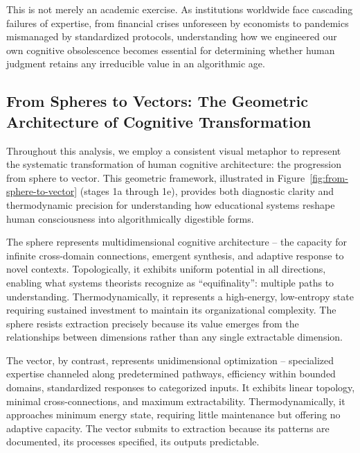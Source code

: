 This is not merely an academic exercise. As institutions worldwide face cascading failures of expertise, from financial crises unforeseen by economists to pandemics mismanaged by standardized protocols, understanding how we engineered our own cognitive obsolescence becomes essential for determining whether human judgment retains any irreducible value in an algorithmic age.

\subsection{From Spheres to Vectors: The Geometric Architecture of Cognitive Transformation}

Throughout this analysis, we employ a consistent visual metaphor to represent the systematic transformation of human cognitive architecture: the progression from sphere to vector. This geometric framework, illustrated in Figure~\ref{fig:from-sphere-to-vector} (stages 1a through 1e), provides both diagnostic clarity and thermodynamic precision for understanding how educational systems reshape human consciousness into algorithmically digestible forms.

The sphere represents multidimensional cognitive architecture – the capacity for infinite cross-domain connections, emergent synthesis, and adaptive response to novel contexts. Topologically, it exhibits uniform potential in all directions, enabling what systems theorists recognize as ``equifinality'': multiple paths to understanding. Thermodynamically, it represents a high-energy, low-entropy state requiring sustained investment to maintain its organizational complexity. The sphere resists extraction precisely because its value emerges from the relationships between dimensions rather than any single extractable dimension.

The vector, by contrast, represents unidimensional optimization – specialized expertise channeled along predetermined pathways, efficiency within bounded domains, standardized responses to categorized inputs. It exhibits linear topology, minimal cross-connections, and maximum extractability. Thermodynamically, it approaches minimum energy state, requiring little maintenance but offering no adaptive capacity. The vector submits to extraction because its patterns are documented, its processes specified, its outputs predictable.

